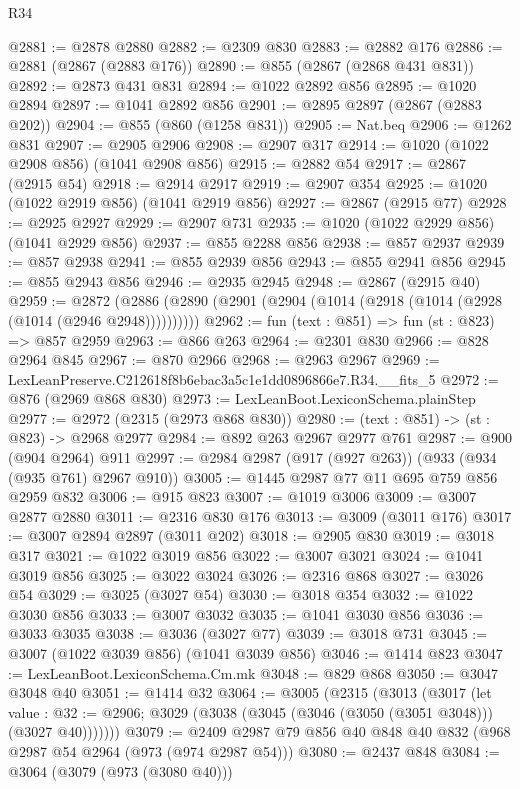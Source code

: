 \begin{lexlean}{R34}
\begin{coremodule}
@2881 := @2878 @2880
@2882 := @2309 @830
@2883 := @2882 @176
@2886 := @2881 (@2867 (@2883 @176))
@2890 := @855 (@2867 (@2868 @431 @831))
@2892 := @2873 @431 @831
@2894 := @1022 @2892 @856
@2895 := @1020 @2894
@2897 := @1041 @2892 @856
@2901 := @2895 @2897 (@2867 (@2883 @202))
@2904 := @855 (@860 (@1258 @831))
@2905 := Nat.beq
@2906 := @1262 @831
@2907 := @2905 @2906
@2908 := @2907 @317
@2914 := @1020 (@1022 @2908 @856) (@1041 @2908 @856)
@2915 := @2882 @54
@2917 := @2867 (@2915 @54)
@2918 := @2914 @2917
@2919 := @2907 @354
@2925 := @1020 (@1022 @2919 @856) (@1041 @2919 @856)
@2927 := @2867 (@2915 @77)
@2928 := @2925 @2927
@2929 := @2907 @731
@2935 := @1020 (@1022 @2929 @856) (@1041 @2929 @856)
@2937 := @855 @2288 @856
@2938 := @857 @2937
@2939 := @857 @2938
@2941 := @855 @2939 @856
@2943 := @855 @2941 @856
@2945 := @855 @2943 @856
@2946 := @2935 @2945
@2948 := @2867 (@2915 @40)
@2959 := @2872 (@2886 (@2890 (@2901 (@2904 (@1014 (@2918 (@1014 (@2928 (@1014 (@2946 @2948))))))))))
@2962 := fun (text : @851) => fun (st : @823) => @857 @2959
@2963 := @866 @263
@2964 := @2301 @830
@2966 := @828 @2964 @845
@2967 := @870 @2966
@2968 := @2963 @2967
@2969 := LexLeanPreserve.C212618f8b6ebac3a5c1e1dd0896866e7.R34.__fits_5
@2972 := @876 (@2969 @868 @830)
@2973 := LexLeanBoot.LexiconSchema.plainStep
@2977 := @2972 (@2315 (@2973 @868 @830))
@2980 := (text : @851) -> (st : @823) -> @2968 @2977
@2984 := @892 @263 @2967 @2977 @761
@2987 := @900 (@904 @2964) @911
@2997 := @2984 @2987 (@917 (@927 @263)) (@933 (@934 (@935 @761) @2967 @910))
@3005 := @1445 @2987 @77 @11 @695 @759 @856 @2959 @832
@3006 := @915 @823
@3007 := @1019 @3006
@3009 := @3007 @2877 @2880
@3011 := @2316 @830 @176
@3013 := @3009 (@3011 @176)
@3017 := @3007 @2894 @2897 (@3011 @202)
@3018 := @2905 @830
@3019 := @3018 @317
@3021 := @1022 @3019 @856
@3022 := @3007 @3021
@3024 := @1041 @3019 @856
@3025 := @3022 @3024
@3026 := @2316 @868
@3027 := @3026 @54
@3029 := @3025 (@3027 @54)
@3030 := @3018 @354
@3032 := @1022 @3030 @856
@3033 := @3007 @3032
@3035 := @1041 @3030 @856
@3036 := @3033 @3035
@3038 := @3036 (@3027 @77)
@3039 := @3018 @731
@3045 := @3007 (@1022 @3039 @856) (@1041 @3039 @856)
@3046 := @1414 @823
@3047 := LexLeanBoot.LexiconSchema.Cm.mk
@3048 := @829 @868
@3050 := @3047 @3048 @40
@3051 := @1414 @32
@3064 := @3005
    (@2315
      (@3013
        (@3017
          (let value : @32 := @2906;
          @3029 (@3038 (@3045 (@3046 (@3050 (@3051 @3048))) (@3027 @40)))))))
@3079 := @2409 @2987 @79 @856 @40 @848 @40 @832 (@968 @2987 @54 @2964 (@973 (@974 @2987 @54)))
@3080 := @2437 @848
@3084 := @3064 (@3079 (@973 (@3080 @40)))

\end{coremodule}
\end{lexlean}
